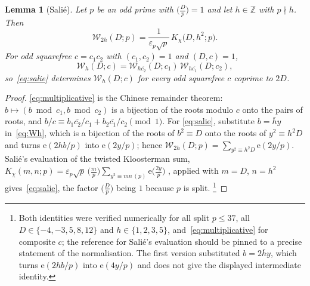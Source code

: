\documentclass[11pt,a4paper]{article}
\newtheorem{lemma}[theorem]{Lemma}
\theoremstyle{remark}\newtheorem{remark}[theorem]{Remark}
\newcommand{\Z}{\mathbb Z}\newcommand{\R}{\mathbb R}\newcommand{\Q}{\mathbb Q}\newcommand{\C}{\mathbb C}
\newcommand{\e}{\mathrm e}\newcommand{\Off}{\mathrm{Off}}\newcommand{\rep}[2]{\langle #1\rangle_{#2}}
\begin{document}
\begin{lemma}[Sali\'e]\label{lem:salie}
Let $p$ be an odd prime with $\bigl(\tfrac Dp\bigr)=1$ and let $h\in\Z$ with $p\nmid h$. Then
\begin{equation}\label{eq:salie}
\mathcal W_{2h}(D;p)=\frac{1}{\varepsilon_p\sqrt p}\,K_\chi\bigl(D,h^2;p\bigr).
\end{equation}
For odd squarefree $c=c_1c_2$ with $(c_1,c_2)=1$ and $(D,c)=1$,
\begin{equation}\label{eq:multiplicative}
\mathcal W_h(D;c)=\mathcal W_{h\overline{c_2}}(D;c_1)\,\mathcal W_{h\overline{c_1}}(D;c_2),
\end{equation}
so~\eqref{eq:salie} determines $\mathcal W_h(D;c)$ for every odd squarefree $c$ coprime to $2D$.
\end{lemma}
\begin{proof}
\eqref{eq:multiplicative} is the Chinese remainder theorem: $b\mapsto(b\bmod c_1,b\bmod c_2)$ is a bijection of the
roots modulo $c$ onto the pairs of roots, and $b/c\equiv b_1\overline{c_2}/c_1+b_2\overline{c_1}/c_2\pmod1$. For
\eqref{eq:salie}, substitute $b=\bar hy$ in~\eqref{eq:Wh}, which is a bijection of the roots of $b^2\equiv D$ onto the
roots of $y^2\equiv h^2D$ and turns $\e(2hb/p)$ into $\e(2y/p)$; hence
$\mathcal W_{2h}(D;p)=\sum_{y^2\equiv h^2D}\e(2y/p)$. Sali\'e's evaluation of the twisted Kloosterman sum,
$K_\chi(m,n;p)=\varepsilon_p\sqrt p\,\bigl(\tfrac mp\bigr)\sum_{y^2\equiv mn\,(p)}\e\bigl(\tfrac{2y}p\bigr)$
\cite[\S4.5]{Iwaniec1997}, applied with $m=D$, $n=h^2$ gives~\eqref{eq:salie}, the factor $\bigl(\tfrac Dp\bigr)$
being $1$ because $p$ is split. \footnote{Both identities were verified numerically for all split $p\le37$, all
$D\in\{-4,-3,5,8,12\}$ and $h\in\{1,2,3,5\}$, and~\eqref{eq:multiplicative} for composite $c$; the reference for
Sali\'e's evaluation should be pinned to a precise statement of the normalisation. The first version substituted
$b=2\bar hy$, which turns $\e(2hb/p)$ into $\e(4y/p)$ and does not give the displayed intermediate identity.}
\end{proof}
\end{document}
